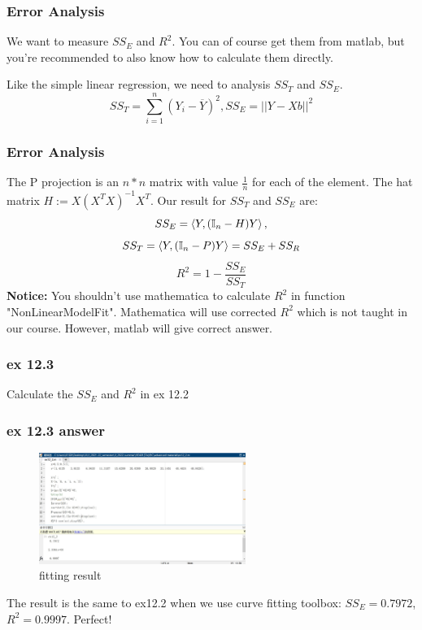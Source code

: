 \documentclass{beamer}
\begin{document}
\begin{frame}
    \frametitle{Error Analysis}

    We want to measure $SS_{E}$ and $R^2$. You can of course get them from matlab, but you're recommended to also know how to calculate them directly.\par
    Like the simple linear regression, we need to analysis $SS_{T}$ and $SS_{E}$.
    \[SS_{T}=\sum\limits_{i=1}^{n}(Y_i-\overline{Y})^2, SS_{E}=||Y-Xb||^2\]


\end{frame}

\begin{frame}
    \frametitle{Error Analysis}

    The P projection is an $n*n$ matrix with value $\frac{1}{n}$ for each of the element. The hat matrix $H:=X(X^{T}X)^{-1}X^{T}$. Our result for $SS_{T}$ and $SS_{E}$ are:
    \[SS_{E}=\Braket{Y, (\mathbb{I}_{n}-H)Y}, \]
    \[SS_{T}=\Braket{Y,(\mathbb{I}_{n}-P)Y}=SS_{E}+SS_{R}\]
    \[R^2=1-\frac{SS_{E}}{SS_{T}}\]
    \textbf{Notice:} You shouldn't use mathematica to calculate $R^2$ in function "NonLinearModelFit". Mathematica will use corrected $R^2$ which is not taught in our course. However, matlab will give correct answer.
\end{frame}

\begin{frame}
    \frametitle{ex 12.3}

    Calculate the $SS_E$ and $R^2$ in ex 12.2

\end{frame}

\begin{frame}
    \frametitle{ex 12.3 answer}

    \begin{figure}[H]
        \centering
        \includegraphics[width=0.6\textwidth,height=0.3\textwidth]{ex12_3.jpg}
        \caption{fitting result}
    \end{figure}\par
    The result is the same to ex12.2 when we use curve fitting toolbox: $SS_{E}=0.7972$, $R^2=0.9997$. Perfect!

\end{frame}
\end{document}
